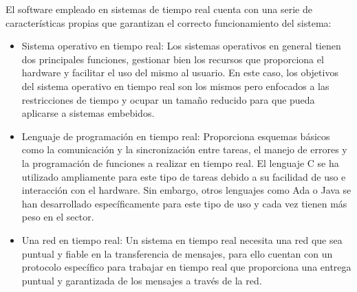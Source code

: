 \documentclass[a4paper,11pt,spanish]{sphinxmanual}
\begin{document}
\sphinxAtStartPar
El software empleado en sistemas de tiempo real cuenta con una serie de
características propias que garantizan el correcto funcionamiento del
sistema:
\begin{itemize}
\item {} 
\sphinxAtStartPar
Sistema operativo en tiempo real: Los sistemas operativos en general
tienen dos principales funciones, gestionar bien los recursos que
proporciona el hardware y facilitar el uso del mismo al usuario. En
este caso, los objetivos del sistema operativo en tiempo real son los
mismos pero enfocados a las restricciones de tiempo y ocupar un
tamaño reducido para que pueda aplicarse a sistemas embebidos.

\item {} 
\sphinxAtStartPar
Lenguaje de programación en tiempo real: Proporciona esquemas básicos
como la comunicación y la sincronización entre tareas, el manejo de
errores y la programación de funciones a realizar en tiempo real. El
lenguaje C se ha utilizado ampliamente para este tipo de tareas
debido a su facilidad de uso e interacción con el hardware. Sin
embargo, otros lenguajes como Ada o Java se han desarrollado
específicamente para este tipo de uso y cada vez tienen más peso en
el sector.

\item {} 
\sphinxAtStartPar
Una red en tiempo real: Un sistema en tiempo real necesita una red
que sea puntual y fiable en la transferencia de mensajes, para ello
cuentan con un protocolo específico para trabajar en tiempo real que
proporciona una entrega puntual y garantizada de los mensajes a
través de la red.

\end{itemize}
\end{document}
